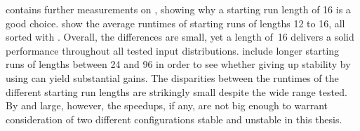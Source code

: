  contains further measurements on \MS{}, showing why a starting run length of 16 is a good choice.
 show the average runtimes of starting runs of lengths 12 to 16, all sorted with \IS{}.
Overall, the differences are small, yet a length of~16 delivers a solid performance throughout all tested input distributions.
 include longer starting runs of lengths between 24 and 96 in order to see whether giving up stability by using \ShS{} can yield substantial gains.
The disparities between the runtimes of the different starting run lengths are strikingly small despite the wide range tested.
By and large, however, the speedups, if any, are not big enough to warrant consideration of two different \MS{} configurations \Dash stable and unstable \Dash in this thesis.
